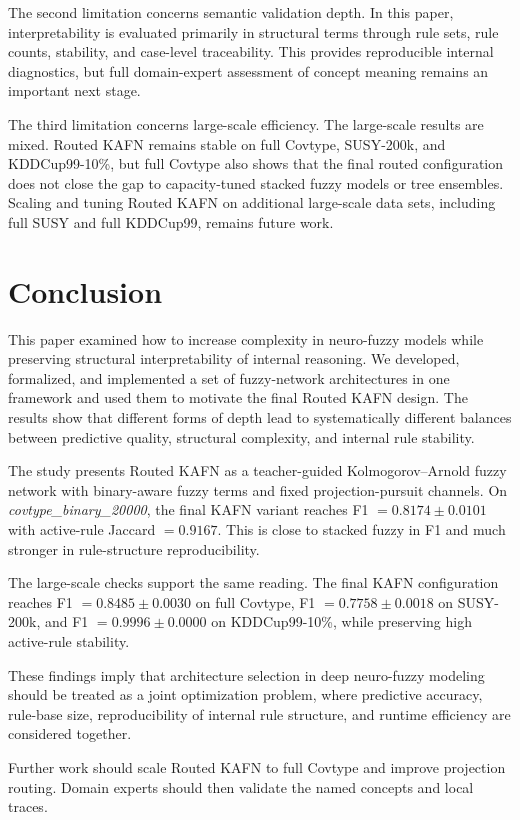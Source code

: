 \documentclass[runningheads]{llncs}
\begin{document}
The second limitation concerns semantic validation depth. In this paper, interpretability is evaluated primarily in structural terms through rule sets, rule counts, stability, and case-level traceability. This provides reproducible internal diagnostics, but full domain-expert assessment of concept meaning remains an important next stage.

The third limitation concerns large-scale efficiency. The large-scale results are mixed. Routed KAFN remains stable on full Covtype, SUSY-200k, and KDDCup99-10\%, but full Covtype also shows that the final routed configuration does not close the gap to capacity-tuned stacked fuzzy models or tree ensembles. Scaling and tuning Routed KAFN on additional large-scale data sets, including full SUSY and full KDDCup99, remains future work.

\section{Conclusion}

This paper examined how to increase complexity in neuro-fuzzy models while preserving structural interpretability of internal reasoning. We developed, formalized, and implemented a set of fuzzy-network architectures in one framework and used them to motivate the final Routed KAFN design. The results show that different forms of depth lead to systematically different balances between predictive quality, structural complexity, and internal rule stability.

The study presents Routed KAFN as a teacher-guided Kolmogorov--Arnold fuzzy network with binary-aware fuzzy terms and fixed projection-pursuit channels. On \textit{covtype\_binary\_20000}, the final KAFN variant reaches F1 $=0.8174\pm0.0101$ with active-rule Jaccard $=0.9167$. This is close to stacked fuzzy in F1 and much stronger in rule-structure reproducibility.

The large-scale checks support the same reading. The final KAFN configuration reaches F1 $=0.8485\pm0.0030$ on full Covtype, F1 $=0.7758\pm0.0018$ on SUSY-200k, and F1 $=0.9996\pm0.0000$ on KDDCup99-10\%, while preserving high active-rule stability.

These findings imply that architecture selection in deep neuro-fuzzy modeling should be treated as a joint optimization problem, where predictive accuracy, rule-base size, reproducibility of internal rule structure, and runtime efficiency are considered together.

Further work should scale Routed KAFN to full Covtype and improve projection routing. Domain experts should then validate the named concepts and local traces.



\end{document}
